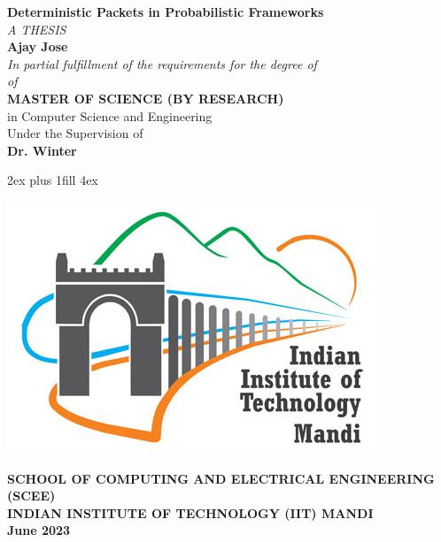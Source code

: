 \thispagestyle{empty}
\setcounter{page}{0}
\vglue 0in
\begin{center}
    {\Large{\bf Deterministic Packets in Probabilistic Frameworks}}\\[5ex]
    {\normalsize \em{A THESIS}}\\[4ex]
    {\large{\bf Ajay Jose}}\\[3ex]
    {\normalsize \em{In partial fulfillment of the requirements for the degree of}}\\[4ex]
    {\normalsize \em{of} }\\[3ex]
    {\large {\bf {MASTER OF SCIENCE (BY RESEARCH)} }}\\[1ex]
    {\normalsize in Computer Science and Engineering}\\[4ex]
    {\large{Under the Supervision of}}\\[1ex]
    {\large{\bf Dr. Winter}}\\

\end{center}

\vglue 2ex plus 1fill  %
\vglue 4ex
\centerline{\includegraphics[scale=0.4]{iitmandi.jpg}}%

\begin{center}
{\normalsize \bf SCHOOL OF COMPUTING AND ELECTRICAL ENGINEERING (SCEE)}\\[1ex]
{\large \bf INDIAN INSTITUTE OF TECHNOLOGY (IIT) MANDI}\\[1ex]
{\bf June 2023}
\end{center}
\clearpage
\thispagestyle{empty}
~\clearpage 